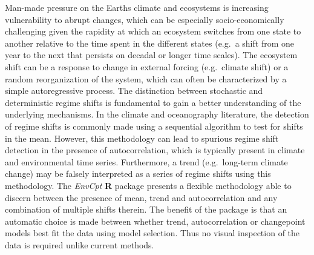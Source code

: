 \documentclass[\main/boa.tex]{subfiles}
\begin{document}
Man-made pressure on the Earths climate and ecosystems is increasing
vulnerability to abrupt changes, which can be especially
socio-economically challenging given the rapidity at which an ecosystem
switches from one state to another relative to the time spent in the
different states (e.g.~a shift from one year to the next that persists
on decadal or longer time scales). The ecosystem shift can be a response
to change in external forcing (e.g.~climate shift) or a random
reorganization of the system, which can often be characterized by a
simple autoregressive process. The distinction between stochastic and
deterministic regime shifts is fundamental to gain a better
understanding of the underlying mechanisms. In the climate and
oceanography literature, the detection of regime shifts is commonly made
using a sequential algorithm to test for shifts in the mean. However,
this methodology can lead to spurious regime shift detection in the
presence of autocorrelation, which is typically present in climate and
environmental time series. Furthermore, a trend (e.g.~long-term climate
change) may be falsely interpreted as a series of regime shifts using
this methodology. The \emph{EnvCpt} \textbf{R} package presents a
flexible methodology able to discern between the presence of mean, trend
and autocorrelation and any combination of multiple shifts therein. The
benefit of the package is that an automatic choice is made between
whether trend, autocorrelation or changepoint models best fit the data
using model selection. Thus no visual inspection of the data is required
unlike current methods.
\end{document}
